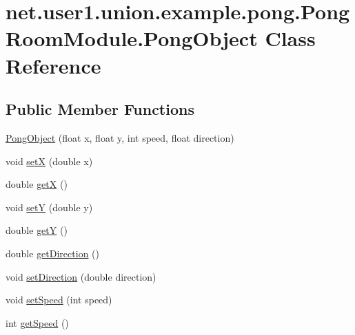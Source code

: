 \hypertarget{classnet_1_1user1_1_1union_1_1example_1_1pong_1_1PongRoomModule_1_1PongObject}{\section{net.\-user1.\-union.\-example.\-pong.\-Pong\-Room\-Module.\-Pong\-Object \-Class \-Reference}
\label{classnet_1_1user1_1_1union_1_1example_1_1pong_1_1PongRoomModule_1_1PongObject}
}
\subsection*{\-Public \-Member \-Functions}
\begin{DoxyCompactItemize}
\item 
\hyperlink{classnet_1_1user1_1_1union_1_1example_1_1pong_1_1PongRoomModule_1_1PongObject_a6439a5de8294edfc36a4f74f9f616628}{\-Pong\-Object} (float x, float y, int speed, float direction)
\item 
void \hyperlink{classnet_1_1user1_1_1union_1_1example_1_1pong_1_1PongRoomModule_1_1PongObject_a420161cb55a6b212087484825d44b5f3}{set\-X} (double x)
\item 
double \hyperlink{classnet_1_1user1_1_1union_1_1example_1_1pong_1_1PongRoomModule_1_1PongObject_a9aa883632aaa09a0c28c7454766de49d}{get\-X} ()
\item 
void \hyperlink{classnet_1_1user1_1_1union_1_1example_1_1pong_1_1PongRoomModule_1_1PongObject_aa08fc0109298435412d9258e4713f8b7}{set\-Y} (double y)
\item 
double \hyperlink{classnet_1_1user1_1_1union_1_1example_1_1pong_1_1PongRoomModule_1_1PongObject_a48b58d4a8a2c235d0e6fd87feac1beb9}{get\-Y} ()
\item 
double \hyperlink{classnet_1_1user1_1_1union_1_1example_1_1pong_1_1PongRoomModule_1_1PongObject_a79b936c9d66dee7faae0b77df0d3e397}{get\-Direction} ()
\item 
void \hyperlink{classnet_1_1user1_1_1union_1_1example_1_1pong_1_1PongRoomModule_1_1PongObject_a8f0d94cf45cc1c6cfc8d1db75ca3c39a}{set\-Direction} (double direction)
\item 
void \hyperlink{classnet_1_1user1_1_1union_1_1example_1_1pong_1_1PongRoomModule_1_1PongObject_aba0106528e7d97d13ea468d65b33eaf6}{set\-Speed} (int speed)
\item 
int \hyperlink{classnet_1_1user1_1_1union_1_1example_1_1pong_1_1PongRoomModule_1_1PongObject_ad7aa9157fed33449eb509ab248eaf92a}{get\-Speed} ()
\end{DoxyCompactItemize}


